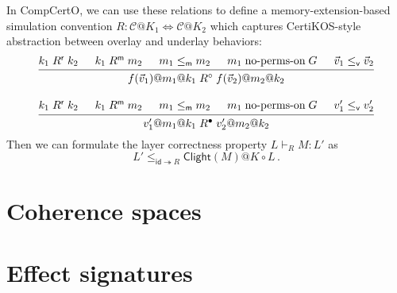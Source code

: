 \documentclass[sigplan,10pt,review,anonymous]{acmart}
\begin{document}
In CompCertO,
we can use these relations to define a
memory-extension-based simulation convention
$R : \mathcal{C}@K_1 \Leftrightarrow \mathcal{C}@K_2$
which captures CertiKOS-style abstraction between
overlay and underlay behaviors:
\begin{gather*}
 {\begin{prooftree}
    \hypo{k_1 \mathrel{R^\mathsf{r}} k_2}
    \hypo{k_1 \mathrel{R^\mathsf{m}} m_2}
    \hypo{m_1 \le_\mathsf{m} m_2}
    \hypo{m_1 \mathrel\text{no-perms-on} G}
    \hypo{\vec{v}_1 \le_\mathsf{v} \vec{v}_2}
    \infer5{f(\vec{v}_1)@m_1@k_1 \mathrel{R^\circ} f(\vec{v}_2)@m_2@k_2}
  \end{prooftree}}
\\[1em]
 {\begin{prooftree}
    \hypo{k_1 \mathrel{R^\mathsf{r}} k_2}
    \hypo{k_1 \mathrel{R^\mathsf{m}} m_2}
    \hypo{m_1 \le_\mathsf{m} m_2}
    \hypo{m_1 \mathrel\text{no-perms-on} G}
    \hypo{v'_1 \le_\mathsf{v} v'_2}
    \infer5{v'_1@m_1@k_1 \mathrel{R^\bullet} v'_2@m_2@k_2}
  \end{prooftree}}
\end{gather*}
Then we can
formulate the layer correctness property
$L \vdash_R M : L'$ as
\[
    L' \le_{\mathsf{id} \twoheadrightarrow R}
    \mathsf{Clight}(M)@K \circ L
    \,.
\]



\section{Coherence spaces} %


\section{Effect signatures} %

\end{document}
